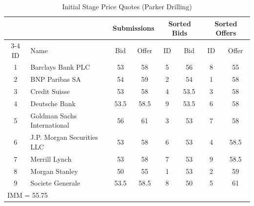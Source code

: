 \begin{table}[htbp]
\centering
\caption{Initial Stage Price Quotes (Parker Drilling)}
\label{tab:quotes}
\begin{tabular}{clcccccc}
\hline\hline
 &  & \multicolumn{2}{c}{Submissions} & \multicolumn{2}{c}{Sorted Bids} & \multicolumn{2}{c}{Sorted Offers} \\
\cline{3-4}\cline{5-6}\cline{7-8}
ID & Name & Bid & Offer & ID & Bid & ID & Offer \\
\hline
1 & Barclays Bank PLC & 53 & 58 & 5 & 56 & 8 & 55 \\
2 & BNP Paribas SA & 54 & 59 & 2 & 54 & 1 & 58 \\
3 & Credit Suisse & 53 & 58 & 4 & 53.5 & 3 & 58 \\
4 & Deutsche Bank & 53.5 & 58.5 & 9 & 53.5 & 6 & 58 \\
5 & Goldman Sachs International & 56 & 61 & 3 & 53 & 7 & 58 \\
6 & J.P. Morgan Securities LLC & 53 & 58 & 6 & 53 & 4 & 58.5 \\
7 & Merrill Lynch & 53 & 58 & 7 & 53 & 9 & 58.5 \\
8 & Morgan Stanley & 50 & 55 & 1 & 53 & 2 & 59 \\
9 & Societe Generale & 53.5 & 58.5 & 8 & 50 & 5 & 61 \\
\hline
\multicolumn{8}{l}{IMM = 55.75} \\
\hline\hline
\end{tabular}
\end{table}

